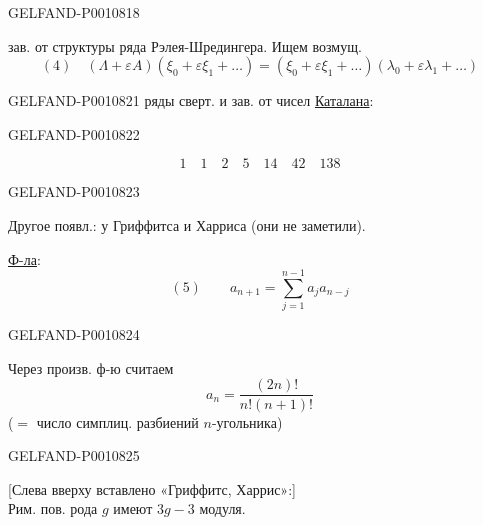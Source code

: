 \begin{GelfandAdjacentEvidence}{GELFAND-P001081}{8}


 зав. от структуры ряда Рэлея-Шредингера. Ищем возмущ.
\begin{equation*}
(4)\quad
(\Lambda+\varepsilon A)(\xi_0+\varepsilon\xi_1+\ldots)
=(\xi_0+\varepsilon\xi_1+\ldots)(\lambda_0+\varepsilon\lambda_1+\ldots)
\end{equation*}
\end{GelfandAdjacentEvidence}



\begin{GelfandAdjacentEvidence}{GELFAND-P001082}{1}
ряды сверт. и зав. от чисел \uline{Каталана}:
\end{GelfandAdjacentEvidence}
\begin{GelfandAdjacentEvidence}{GELFAND-P001082}{2}

\[
1\quad 1\quad 2\quad 5\quad 14\quad 42\quad 138
\]
\end{GelfandAdjacentEvidence}
\begin{GelfandAdjacentEvidence}{GELFAND-P001082}{3}


Другое появл.: у Гриффитса и Харриса (они не заметили).

\uline{Ф-ла}:
\[
(5)\qquad a_{n+1}=\sum_{j=1}^{n-1}a_j a_{n-j}
\]
\end{GelfandAdjacentEvidence}
\begin{GelfandAdjacentEvidence}{GELFAND-P001082}{4}


Через произв. ф-ю считаем
\[
a_n=\frac{(2n)!}{n!(n+1)!}
\]
($=$ число симплиц. разбиений $n$-угольника)
\end{GelfandAdjacentEvidence}
\begin{GelfandAdjacentEvidence}{GELFAND-P001082}{5}


[Слева вверху вставлено «Гриффитс, Харрис»:]\\
Рим. пов. рода $g$ имеют $3g-3$ модуля.
\end{GelfandAdjacentEvidence}
